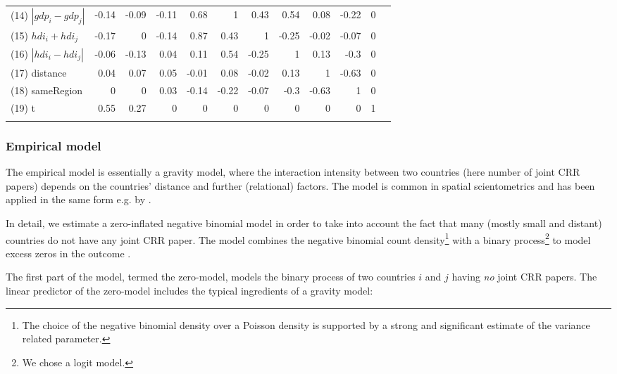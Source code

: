 \begin{landscape}
\begin{table}[ht]
\begin{threeparttable}
\begin{small}
\begin{tabular}{lrrrrrrrrrrr}
(14)	$|gdp_i-gdp_j|$	&	-0.14	&	-0.09	&	-0.11	&	0.68	&	1	&	0.43	&	0.54	&	0.08	&	-0.22	&	0	\\
(15)	$hdi_i+hdi_j$	&	-0.17	&	0	&	-0.14	&	0.87	&	0.43	&	1	&	-0.25	&	-0.02	&	-0.07	&	0	\\
(16)	$|hdi_i-hdi_j|$	&	-0.06	&	-0.13	&	0.04	&	0.11	&	0.54	&	-0.25	&	1	&	0.13	&	-0.3	&	0	\\
(17)	distance	&	0.04	&	0.07	&	0.05	&	-0.01	&	0.08	&	-0.02	&	0.13	&	1	&	-0.63	&	0	\\
(18)	sameRegion	&	0	&	0	&	0.03	&	-0.14	&	-0.22	&	-0.07	&	-0.3	&	-0.63	&	1	&	0	\\
(19)	t	&	0.55	&	0.27	&	0	&	0	&	0	&	0	&	0	&	0	&	0	&	1	\\
\noalign{\smallskip}\hline
\end{tabular}
\end{small}
	\end{threeparttable}
\end{table}

\end{landscape}



\subsubsection{Empirical model}

The empirical model is essentially a gravity model, where the interaction intensity between two countries (here number of joint CRR papers) depends on the countries' distance and further (relational) factors. The model is common in spatial scientometrics \citep{frenken2009spatial} and has been applied in the same form e.g. by \cite{hoekman2009geography}.

In detail, we estimate a zero-inflated negative binomial model in order to take into account the fact that many (mostly small and distant) countries do not have any joint CRR paper. The model combines the negative binomial count density\footnote{The choice of the negative binomial density over a Poisson density is supported by a strong and significant estimate of the variance related parameter.} with a binary process\footnote{We chose a logit model.} to model excess zeros in the outcome \citep[see e.g.][p.681]{cameron2005microeconometrics}. 

The first part of the model, termed the zero-model, models the binary process of two countries $i$ and $j$ having \textit{no} joint CRR papers. The linear predictor of the zero-model includes the typical ingredients of a gravity model:

